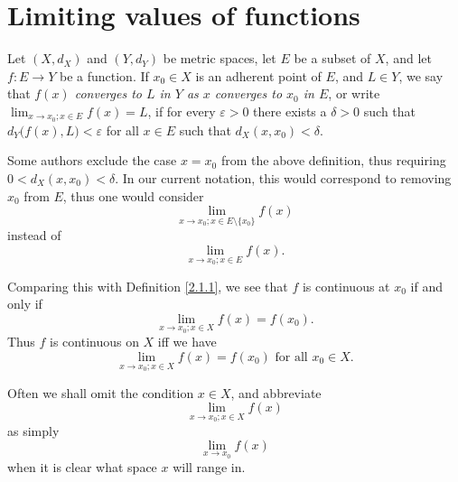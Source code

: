 \section{Limiting values of functions}\label{sec 3.1}

\begin{definition}\label{3.1.1}
    Let \((X, d_X)\) and \((Y, d_Y)\) be metric spaces, let \(E\) be a subset of \(X\), and let \(f : E \to Y\) be a function.
    If \(x_0 \in X\) is an adherent point of \(E\), and \(L \in Y\), we say that \emph{\(f(x)\) converges to \(L\) in \(Y\) as \(x\) converges to \(x_0\) in \(E\)}, or write \(\lim_{x \to x_0 ; x \in E} f(x) = L\), if for every \(\varepsilon > 0\) there exists a \(\delta > 0\) such that \(d_Y\big(f(x), L\big) < \varepsilon\) for all \(x \in E\) such that \(d_X(x, x_0) < \delta\).
\end{definition}

\begin{remark}\label{3.1.2}
    Some authors exclude the case \(x = x_0\) from the above definition, thus requiring \(0 < d_X(x, x_0) < \delta\).
    In our current notation, this would correspond to removing \(x_0\) from \(E\), thus one would consider
    \[
        \lim_{x \to x_0 ; x \in E \setminus \{x_0\}} f(x)
    \]
    instead of
    \[
        \lim_{x \to x_0 ; x \in E} f(x).
    \]
\end{remark}

\begin{note}
    Comparing this with Definition \ref{2.1.1}, we see that \(f\) is continuous at \(x_0\) if and only if
    \[
        \lim_{x \to x_0 ; x \in X} f(x) = f(x_0).
    \]
    Thus \(f\) is continuous on \(X\) iff we have
    \[
        \lim_{x \to x_0 ; x \in X} f(x) = f(x_0) \text{ for all } x_0 \in X.
    \]
\end{note}

\setcounter{theorem}{3}
\begin{remark}\label{3.1.4}
    Often we shall omit the condition \(x \in X\), and abbreviate
    \[
        \lim_{x \to x_0 ; x \in X} f(x)
    \]
    as simply
    \[
        \lim_{x \to x_0} f(x)
    \]
    when it is clear what space \(x\) will range in.
\end{remark}